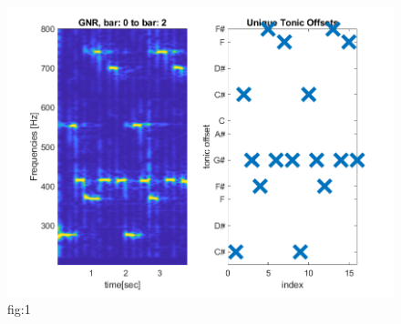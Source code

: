 \documentclass{article}
\begin{document}
        \begin{figure}[h]\label{fig:1}
            \includegraphics[width=12cm]{gnr-spectro.png}
            \centering
            \caption{fig:1}
        \end{figure}
\end{document}
